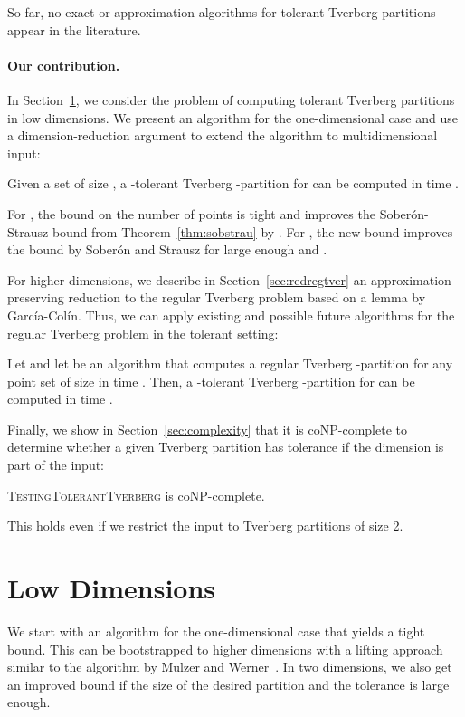 \documentclass[oribibl,envcountsame,envcountsect]{llncs}
\newcommand{\Soberon}{Sober\'{o}n}
\newcommand{\GarciaColin}{Garc\'{i}a-Col\'{i}n}
\begin{document}
So far,
no exact or approximation algorithms for tolerant Tverberg partitions appear in
the literature.

\paragraph{Our contribution.}
\newenvironment{prfTODO}{\begin{proof}[TODO]}{\qed\end{proof}}

In Section~\ref{sec:ld}, we consider the problem of computing
tolerant Tverberg partitions in low dimensions. We present an
algorithm for the one-dimensional case and use a dimension-reduction
argument to extend the algorithm to multidimensional input:
\begin{theorem}\label{thm:dr_tverberg}
  Given a set  of size ,
  a -tolerant Tverberg -partition
  for  can be computed in time .
\end{theorem}
For , the bound on the number of points is tight and improves
the \Soberon{}-Strausz bound from Theorem~\ref{thm:sobstrau} by
. For , the new bound improves the bound
by \Soberon{} and Strausz for large enough  and .

For higher dimensions, we describe in Section~\ref{sec:redregtver} an
approximation-preserving reduction to the regular Tverberg problem based on a
lemma by \GarciaColin{}. Thus, we
can apply existing and possible future algorithms for the regular Tverberg
problem in the tolerant setting:

\begin{proposition} \label{apr:prop:cb}
  Let  and let  be an
  algorithm that computes a regular Tverberg -partition
  for any point set of size  in time .
  Then, a -tolerant Tverberg
  -partition for  can be computed in time
  .
\end{proposition}

Finally, we show in Section~\ref{sec:complexity} that it is
coNP-complete to determine whether a given Tverberg partition has
tolerance  if the dimension is part of the input:
\begin{theorem}\label{thm:complexity}
  \textsc{TestingTolerantTverberg} is coNP-complete.
\end{theorem}
This holds even if we restrict the input to Tverberg partitions of size 2.

\section{Low Dimensions} \label{sec:ld}
We start with an algorithm for the one-dimensional case that yields a
tight bound. This can be bootstrapped to higher dimensions with a lifting approach
similar to the algorithm by Mulzer and Werner~\cite{Mulzer2013}. In two dimensions, we also get
an improved bound if the size of the desired partition and the
tolerance is large enough.
\end{document}
